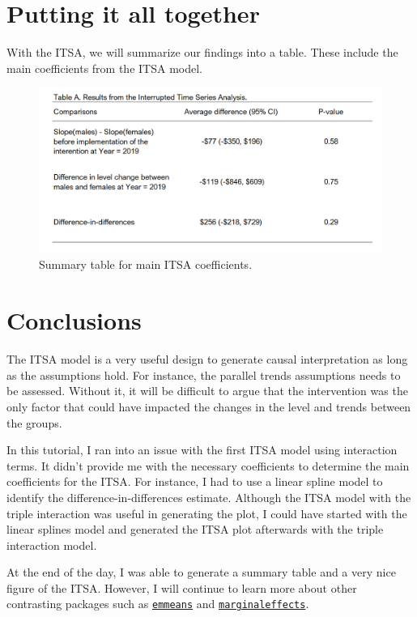 \documentclass[
]{book}
\begin{document}
\hypertarget{putting-it-all-together}{%
\section{Putting it all together}\label{putting-it-all-together}}

With the ITSA, we will summarize our findings into a table. These include the main coefficients from the ITSA model.

\begin{figure}
\includegraphics[width=1\linewidth]{Figure 6_4} \caption{Summary table for main ITSA coefficients.}\label{fig:unnamed-chunk-95}
\end{figure}

\hypertarget{conclusions-5}{%
\section{Conclusions}\label{conclusions-5}}

The ITSA model is a very useful design to generate causal interpretation as long as the assumptions hold. For instance, the parallel trends assumptions needs to be assessed. Without it, it will be difficult to argue that the intervention was the only factor that could have impacted the changes in the level and trends between the groups.

In this tutorial, I ran into an issue with the first ITSA model using interaction terms. It didn't provide me with the necessary coefficients to determine the main coefficients for the ITSA. For instance, I had to use a linear spline model to identify the difference-in-differences estimate. Although the ITSA model with the triple interaction was useful in generating the plot, I could have started with the linear splines model and generated the ITSA plot afterwards with the triple interaction model.

At the end of the day, I was able to generate a summary table and a very nice figure of the ITSA. However, I will continue to learn more about other contrasting packages such as \href{https://github.com/rvlenth/emmeans}{\texttt{emmeans}} and \href{https://github.com/vincentarelbundock/marginaleffects}{\texttt{marginaleffects}}.
\end{document}

